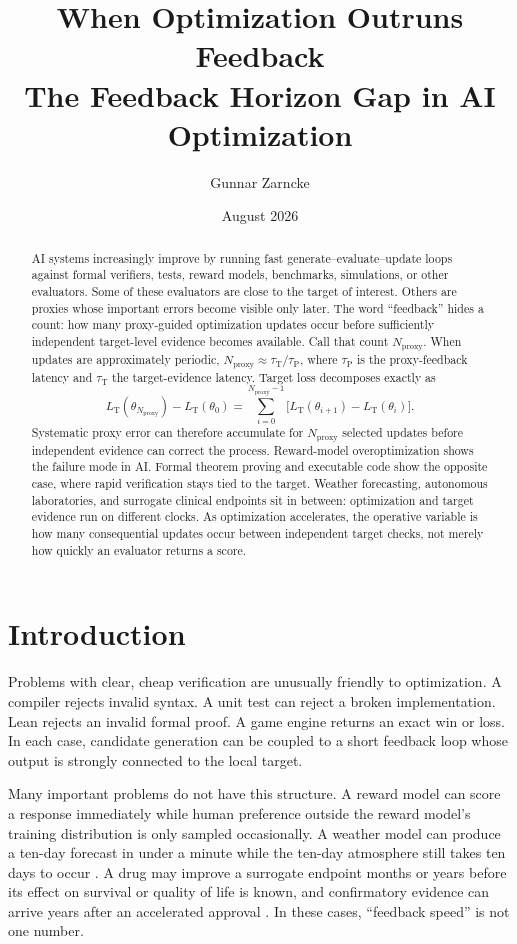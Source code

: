 \documentclass[11pt]{article}
\title{\textbf{When Optimization Outruns Feedback}\\
\large The Feedback Horizon Gap in AI Optimization}
\author{Gunnar Zarncke}
\date{August 2026}
\newcommand{\tauP}{\tau_{\mathrm{P}}}
\newcommand{\tauT}{\tau_{\mathrm{T}}}
\newcommand{\LT}{L_{\mathrm{T}}}
\newcommand{\Nproxy}{N_{\mathrm{proxy}}}
\begin{document}
\maketitle

\begin{abstract}
AI systems increasingly improve by running fast generate--evaluate--update loops against formal verifiers, tests, reward models, benchmarks, simulations, or other evaluators. Some of these evaluators are close to the target of interest. Others are proxies whose important errors become visible only later. The word ``feedback'' hides a count: how many proxy-guided optimization updates occur before sufficiently independent target-level evidence becomes available. Call that count \(\Nproxy\). When updates are approximately periodic, \(\Nproxy \approx \tauT/\tauP\), where \(\tauP\) is the proxy-feedback latency and \(\tauT\) the target-evidence latency. Target loss decomposes exactly as
\[
\LT(\theta_{\Nproxy})-\LT(\theta_0)
=
\sum_{i=0}^{\Nproxy-1}
\bigl[\LT(\theta_{i+1})-\LT(\theta_i)\bigr].
\]
Systematic proxy error can therefore accumulate for \(\Nproxy\) selected updates before independent evidence can correct the process. Reward-model overoptimization shows the failure mode in AI. Formal theorem proving and executable code show the opposite case, where rapid verification stays tied to the target. Weather forecasting, autonomous laboratories, and surrogate clinical endpoints sit in between: optimization and target evidence run on different clocks. As optimization accelerates, the operative variable is how many consequential updates occur between independent target checks, not merely how quickly an evaluator returns a score.
\end{abstract}

\section{Introduction}

Problems with clear, cheap verification are unusually friendly to optimization. A compiler rejects invalid syntax. A unit test can reject a broken implementation. Lean rejects an invalid formal proof. A game engine returns an exact win or loss. In each case, candidate generation can be coupled to a short feedback loop whose output is strongly connected to the local target.

Many important problems do not have this structure. A reward model can score a response immediately while human preference outside the reward model's training distribution is only sampled occasionally. A weather model can produce a ten-day forecast in under a minute while the ten-day atmosphere still takes ten days to occur \parencite{lam2023graphcast}. A drug may improve a surrogate endpoint months or years before its effect on survival or quality of life is known, and confirmatory evidence can arrive years after an accelerated approval \parencite{gyawali2019accelerated,liu2024clinicalbenefit}. In these cases, ``feedback speed'' is not one number.
\end{document}
